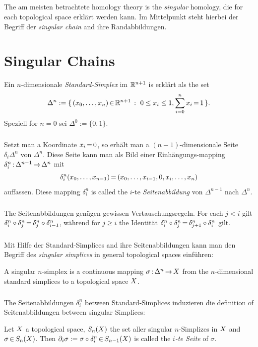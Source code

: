 \documentclass[11pt,twoside]{article}
\begin{document}
\subparagraph{}
The am meisten betrachtete homology theory is the \textit{singular} homology,
die for each topological space erkl\"art werden kann.
Im Mittelpunkt steht hierbei der Begriff der \textit{singular chain} and
ihre Randabbildungen.

\section{Singular Chains}
Ein $n$-dimensionale \textit{Standard-Simplex} im ${\mathbb{R}}^{n+1}$ is erkl\"art
als the set
\[
\Delta^n := \{ \, (x_0,\ldots,x_n) {\,\in\,} {\mathbb{R}}^{n+1} \,: \,  \, 0 \leq x_i \leq 1, \sum_{i=0}^n x_i {\,=\,} 1 \, \}.
\]
Speziell for $n=0$ sei $\Delta^0 := \{0,1\}$.

\subparagraph{}
Setzt man a Koordinate $x_i {\,=\,} 0$,
so erh\"alt man a $(n-1)$-dimensionale Seite $\delta_i \Delta^n$
von $\Delta^n$.
Diese Seite kann man als Bild einer Einh\"angungs-mapping
$\delta^n_i {\,:\,} \Delta^{n-1} {\,\to\,} \Delta^n$ mit
\[
\delta^n_i(x_0,\ldots,x_{n-1}) {\,=\,} (x_0,\ldots,x_{i-1},0,x_i,\ldots,x_n)
\]
auffassen.
Diese mapping $\delta^n_i$ is called the $i$-te \textit{Seitenabbildung} von
$\Delta^{n-1}$ nach $\Delta^n$.

\subparagraph{}
The Seitenabbildungen gen\"ugen gewissen Vertauschungsregeln.
For each $j < i$ gilt
$\delta^n_i \circ \delta^n_j {\,=\,} \delta^n_j \circ \delta^n_{i-1}$,
w\"ahrend for $j \geq i$ the Identit\"at
$\delta^n_i \circ \delta^n_j {\,=\,} \delta^n_{j+1} \circ \delta^n_i$ gilt.

\subparagraph{}
Mit Hilfe der Standard-Simplices and ihre Seitenabbildungen kann man den
Begriff des \textit{singular simplices} in general topological spaces
einf\"uhren:

\begin{definition}
A {singular $n$-simplex} is a continuous mapping
$\sigma {\,:\,} \Delta^n {\,\to\,} X$ from the $n$-dimensional
standard simplices to a topological space $X$.
\end{definition}

\subparagraph{}
The Seitenabbildungen $\delta^n_i$ between Standard-Simplices induzieren die
definition of Seitenabbildungen between singular Simplices:

\begin{definition}
Let $X$ a topological space,
$S_n(X)$ the set aller singular $n$-Simplizes in $X$
and $\sigma {\,\in\,} S_n(X)$.
Then $\partial_i \sigma := \sigma \circ \delta_i^n {\,\in\,} S_{n-1}(X)$
is called the \textit{$i$-te Seite} of $\sigma$.
\end{definition}
\end{document}

